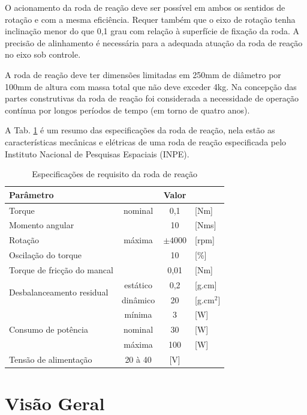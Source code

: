 O acionamento da roda de reação deve ser possível em ambos os sentidos de rotação e com a mesma eficiência. Requer também que o eixo de rotação tenha inclinação menor do que 0,1 grau com relação à superfície de fixação da roda. A precisão de alinhamento é necessária para a adequada atuação da roda de reação no eixo sob controle.

A roda de reação deve ter dimensões limitadas em 250mm de diâmetro por 100mm de altura com massa total que não deve exceder 4kg. Na concepção das partes construtivas da roda de reação foi considerada a necessidade de operação contínua por longos períodos de tempo (em torno de quatro anos).

A Tab. \ref{tab:PMM:especificações} é um resumo das especificações da roda de reação, nela estão as características mecânicas e elétricas de uma roda de reação especificada pelo Instituto Nacional de Pesquisas Espaciais (INPE).

\begin{table}[!ht]
    \centering
    \begin{tabular}{l c c l }
		Parâmetro & & Valor &   \\
       	\hline \hline
 		Torque   					& nominal	  & 0,1 & [Nm]  \\
 		Momento angular  			&	  & 10 &      [Nms] \\
 		Rotação 					& máxima		  & $\pm4000$ & [rpm] \\
 		Oscilação do torque 		&		  & 10  & [\%] \\
 		Torque de fricção do mancal &		  & 0,01 & [Nm] \\
 		\multirow{2}{*}{Desbalanceamento residual} & estático & 0,2 & [g.cm]\\
 		& dinâmico & 20  & [g.cm$^{2}$]  \\
 		\multirow{3}{*}{Consumo de potência} 
 		& mínima & 3 & [W] 	 \\
 		& nominal & 30 & [W] \\
 		& máxima & 100 & [W] 	\\	
 		Tensão de alimentação  & 20 à 40 & [V]  \\
    \end{tabular}
    \caption{Especificações de requisito da roda de reação}
    \label{tab:PMM:especificações}
\end{table}



\section{Visão Geral}

